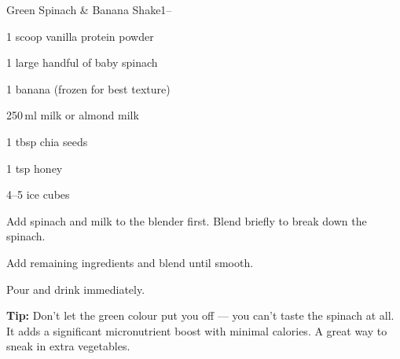 \begin{recipebox}{Green Spinach \& Banana Shake}{1}{--}
\begin{ingredients}
  \item 1 scoop vanilla protein powder
  \item 1 large handful of baby spinach
  \item 1 banana (frozen for best texture)
  \item 250\,ml milk or almond milk
  \item 1 tbsp chia seeds
  \item 1 tsp honey
  \item 4--5 ice cubes
\end{ingredients}

\begin{method}
  \item Add spinach and milk to the blender first. Blend briefly to break down the spinach.
  \item Add remaining ingredients and blend until smooth.
  \item Pour and drink immediately.
\end{method}


\begin{notelist}
  \item \textbf{Tip:} Don't let the green colour put you off --- you can't taste the spinach at all. It adds a significant micronutrient boost with minimal calories. A great way to sneak in extra vegetables.
\end{notelist}
\end{recipebox}
